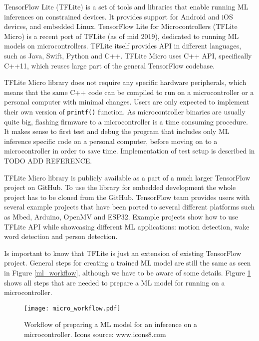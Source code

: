 TensorFlow Lite (TFLite) is a set of tools and libraries that enable running ML inferences on constrained devices\cite{tensorflow_github}.
It provides support for Android and iOS devices, and embedded Linux.
TensorFlow Lite for Microcontrollers (TFLite Micro) is a recent port of TFLite (as of mid 2019), dedicated to running ML models on microcontrollers.
TFLite itself provides API in different languages, such as Java, Swift, Python and C++.
TFLite Micro uses C++ API, specifically C++11, which reuses large part of the general TensorFlow codebase.

TFLite Micro library does not require any specific hardware peripherals, which means that the same C++ code can be compiled to run on a microcontroller or a personal computer with minimal changes.
Users are only expected to implement their own version of \verb|printf()| function.
As microcontroller binaries are usually quite big, flashing firmware to a microcontroller is a time consuming procedure.
It makes sense to first test and debug the program that includes only ML inference specific code on a personal computer, before moving on to a microcontroller in order to save time.
Implementation of test setup is described in TODO ADD REFERENCE.

TFLite Micro library is publicly available as a part of a much larger TensorFlow project on GitHub\cite{tensorflow_github}.
To use the library for embedded development the whole project has to be cloned from the GitHub.
TensorFlow team provides users with several example projects that have been ported to several different platforms such as Mbed, Arduino, OpenMV and ESP32.
Example projects show how to use TFLite API while showcasing different ML applications: motion detection, wake word detection and person detection.

Is important to know that TFLite is just an extension of existing TensorFlow project.
General steps for creating a trained ML model are still the same as seen in Figure \ref{ml_workflow}, although we have to be aware of some details.
Figure \ref{micro_workflow} shows all steps that are needed to prepare a ML model for running on a microcontroller.

\begin{figure}[ht] 
    \centering
    \texttt{[image: micro\_workflow.pdf]} 
    \caption{  Workflow of preparing a ML model for an inference on a microcontroller. Icons source: www.icons8.com}
    \label{micro_workflow}
\end{figure}


